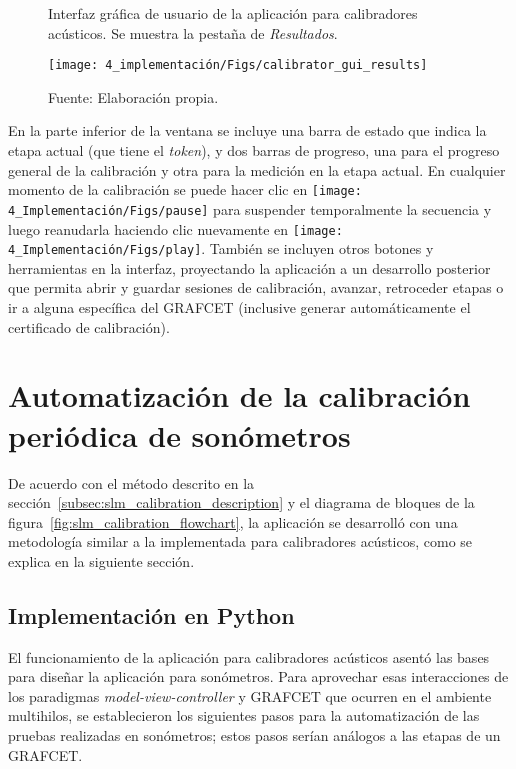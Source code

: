 \begin{figure}[!h]
    \centering
    \caption{Interfaz gráfica de usuario de la aplicación para calibradores acústicos. Se muestra la pestaña de \emph{Resultados}.}
    \label{fig:calibrator_gui_results}
    \texttt{[image: 4\_implementación/Figs/calibrator\_gui\_results]}
    \caption*{\footnotesize Fuente: Elaboración propia.}
\end{figure}

En la parte inferior de la ventana se incluye una barra de estado que indica la etapa actual (que tiene el \emph{token}), y dos barras de progreso, una para el progreso general de la calibración y otra para la medición en la etapa actual.
En cualquier momento de la calibración se puede hacer clic en \texttt{[image: 4\_Implementación/Figs/pause]} para suspender temporalmente la secuencia y luego reanudarla haciendo clic nuevamente en \texttt{[image: 4\_Implementación/Figs/play]}.
También se incluyen otros botones y herramientas en la interfaz, proyectando la aplicación a un desarrollo posterior que permita abrir y guardar sesiones de calibración, avanzar, retroceder etapas o ir a alguna específica del GRAFCET (inclusive generar automáticamente el certificado de calibración).


\section{Automatización de la calibración periódica de sonómetros}

De acuerdo con el método descrito en la sección~\ref{subsec:slm_calibration_description} y el diagrama de bloques de la figura~\ref{fig:slm_calibration_flowchart}, la aplicación se desarrolló con una metodología similar a la implementada para calibradores acústicos, como se explica en la siguiente sección.

\subsection{Implementación en Python}
El funcionamiento de la aplicación para calibradores acústicos asentó las bases para diseñar la aplicación para sonómetros.
Para aprovechar esas interacciones de los paradigmas \emph{model-view-controller} y GRAFCET que ocurren en el ambiente multihilos, se establecieron los siguientes pasos para la automatización de las pruebas realizadas en sonómetros;
estos pasos serían análogos a las etapas de un GRAFCET\@.

